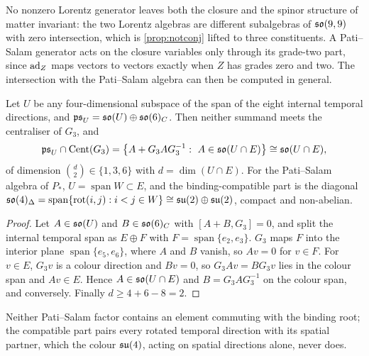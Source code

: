 No nonzero Lorentz generator leaves both the closure and the spinor structure of matter invariant: the two Lorentz algebras are different
subalgebras of $\mathfrak{so}(9,9)$ with zero intersection, which is \cref{prop:notconj} lifted to three constituents. A Pati--Salam generator acts on the
closure variables only through its grade-two part, since $\operatorname{ad}_Z$ maps vectors to vectors exactly when $Z$ has grades zero and two. The intersection
with the Pati--Salam algebra can then be computed in general.

\begin{theorem}
\label{thm:PSbinding}
Let $U$ be any four-dimensional subspace of the span of the eight internal temporal directions, and $\mathfrak{ps}_U=\mathfrak{so}(U)\oplus\mathfrak{so}(6)_C$. Then neither
summand meets the centraliser of $G_3$, and
\[
\mathfrak{ps}_U\cap\Cent(G_3)=\bigl\{A+G_3AG_3^{-1}:\ A\in\so{U\cap E}\bigr\}\cong\so{U\cap E},
\]
of dimension $\binom d2\in\{1,3,6\}$ with $d=\dim(U\cap E)$. For the Pati--Salam algebra of $P_*$, $U=\operatorname{span}W\subset E$, and the
binding-compatible part is the diagonal $\mathfrak{so}(4)_\Delta=\operatorname{span}\{\mathrm{rot}(i,j):i<j\in W\}\cong\mathfrak{su}(2)\oplus\mathfrak{su}(2)$, compact and non-abelian.
\end{theorem}

\begin{proof}
Let $A\in\mathfrak{so}(U)$ and $B\in\mathfrak{so}(6)_C$ with $[A+B,G_3]=0$, and split the internal temporal span as $E\oplus F$ with $F=\operatorname{span}\{e_2,e_3\}$. $G_3$ maps
$F$ into the interior plane $\operatorname{span}\{e_5,e_6\}$, where $A$ and $B$ vanish, so $Av=0$ for $v\in F$. For $v\in E$, $G_3v$ is a colour direction
and $Bv=0$, so $G_3Av=BG_3v$ lies in the colour span and $Av\in E$. Hence $A\in\mathfrak{so}(U\cap E)$ and $B=G_3AG_3^{-1}$ on the colour span, and conversely.
Finally $d\ge4+6-8=2$.
\end{proof}

Neither Pati--Salam factor contains an element commuting with the binding root; the compatible part pairs every rotated temporal direction with
its spatial partner, which the colour $\mathfrak{su}(4)$, acting on spatial directions alone, never does.

